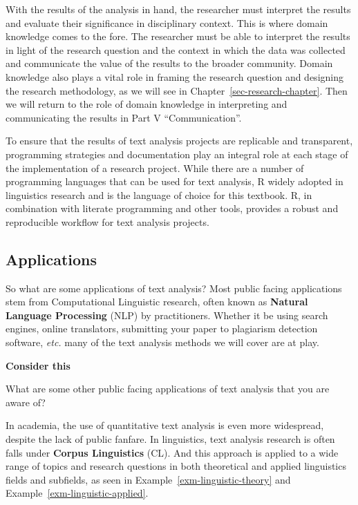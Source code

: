 \documentclass[
  letterpaper,
]{latex/krantz}
\theoremstyle{definition}
\theoremstyle{remark}
\begin{document}
With the results of the analysis in hand, the researcher must interpret
the results and evaluate their significance in disciplinary context.
This is where domain knowledge comes to the fore. The researcher must be
able to interpret the results in light of the research question and the
context in which the data was collected and communicate the value of the
results to the broader community. Domain knowledge also plays a vital
role in framing the research question and designing the research
methodology, as we will see in Chapter~\ref{sec-research-chapter}. Then
we will return to the role of domain knowledge in interpreting and
communicating the results in Part V ``Communication''.

To ensure that the results of text analysis projects are replicable and
transparent, programming strategies and documentation play an integral
role at each stage of the implementation of a research project. While
there are a number of programming languages that can be used for text
analysis, R widely adopted in linguistics research and is the language
of choice for this textbook. R, in combination with literate programming
and other tools, provides a robust and reproducible workflow for text
analysis projects.

\subsection{Applications}\label{applications}

So what are some applications of text analysis? Most public facing
applications stem from Computational Linguistic research, often known as
\textbf{Natural Language Processing} (NLP) by practitioners. Whether it
be using search engines, online translators, submitting your paper to
plagiarism detection software, \emph{etc.} many of the text analysis
methods we will cover are at play.

\begin{tcolorbox}[enhanced jigsaw, colframe=quarto-callout-color-frame, breakable, bottomrule=.15mm, arc=.35mm, left=2mm, opacityback=0, rightrule=.15mm, colback=white, toprule=.15mm, leftrule=.75mm]

\textbf{ Consider this}

What are some other public facing applications of text analysis that you
are aware of?

\end{tcolorbox}

In academia, the use of quantitative text analysis is even more
widespread, despite the lack of public fanfare. In linguistics, text
analysis research is often falls under
\textbf{Corpus Linguistics} (CL). And this
approach is applied to a wide range of topics and research questions in
both theoretical and applied linguistics fields and subfields, as seen
in Example~\ref{exm-linguistic-theory} and
Example~\ref{exm-linguistic-applied}.
\end{document}
